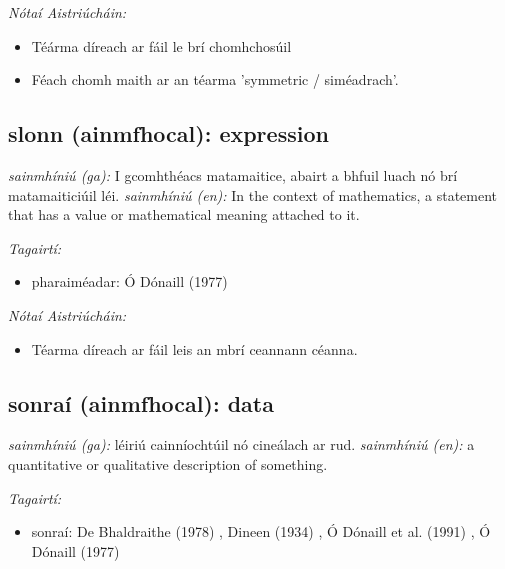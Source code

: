 \documentclass{article}
\begin{document}
 \noindent \textit{Nótaí Aistriúcháin:}
\begin{itemize}
	\item Téárma díreach ar fáil le brí chomhchosúil
	\item Féach chomh maith ar an téarma 'symmetric / siméadrach'.
\end{itemize}


\subsection*{slonn (ainmfhocal): expression} 
 \noindent \textit{sainmhíniú (ga):} I gcomhthéacs matamaitice, abairt a bhfuil luach nó brí matamaiticiúil léi.
\newline\newline
 \noindent \textit{sainmhíniú (en):} In the context of mathematics, a statement that has a value or mathematical meaning attached to it.
\newline

 \noindent \textit{Tagairtí:}
\begin{itemize}
	\item pharaiméadar: Ó Dónaill (1977) \cite{odonaill}
\end{itemize}

 \noindent \textit{Nótaí Aistriúcháin:}
\begin{itemize}
	\item Téarma díreach ar fáil leis an mbrí ceannann céanna.
\end{itemize}


\subsection*{sonraí (ainmfhocal): data} 
 \noindent \textit{sainmhíniú (ga):} léiriú cainníochtúil nó cineálach ar rud.
\newline\newline
 \noindent \textit{sainmhíniú (en):} a quantitative or qualitative description of something.
\newline

 \noindent \textit{Tagairtí:}
\begin{itemize}
	\item sonraí: De Bhaldraithe (1978) \cite{de-bhaldraithe}, Dineen (1934) \cite{dineen}, Ó Dónaill et al. (1991) \cite{focloir-beag}, Ó Dónaill (1977) \cite{odonaill}
\end{itemize}
\end{document}
